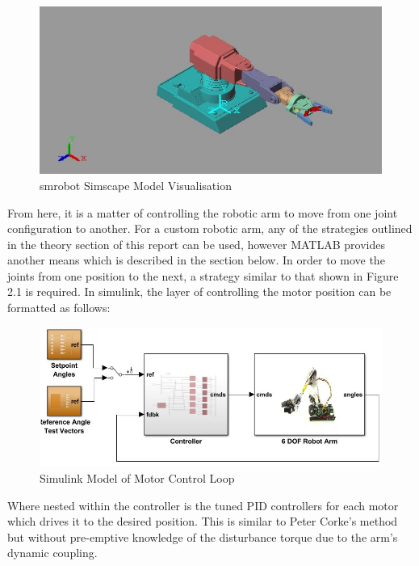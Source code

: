 \documentclass[12pt,openany,a4paper]{book}
\begin{document}
\begin{center}
\begin{figure}[htb]
  \includegraphics[width=\linewidth]{simscape_robotic_arm_model.jpg}
\caption{smrobot Simscape Model Visualisation}
\end{figure}
\end{center}

From here, it is a matter of controlling the robotic arm to move from one joint configuration to another. For a custom robotic arm, any of the strategies outlined in the theory section of this report can be used, however MATLAB provides another means which is described in the section below. In order to move the joints from one position to the next, a strategy similar to that shown in Figure 2.1 is required. In simulink, the layer of controlling the motor position can be formatted as follows:

\begin{center}
\begin{figure}[htb]
  \includegraphics[width=\linewidth]{simulink_motor_control_loop.jpg}
\caption{Simulink Model of Motor Control Loop}
\end{figure}
\end{center}

Where nested within the controller is the tuned PID controllers for each motor which drives it to the desired position. This is similar to Peter Corke's method but without pre-emptive knowledge of the disturbance torque due to the arm's dynamic coupling.
\end{document}
